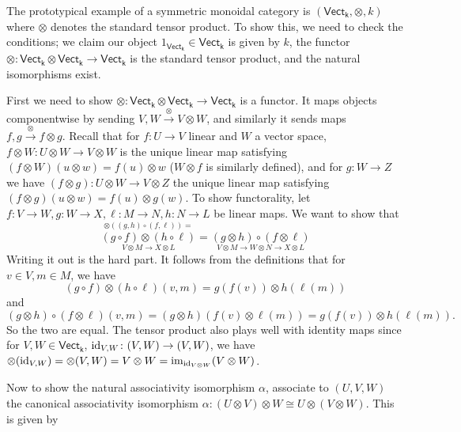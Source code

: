 \begin{example}
    The prototypical example of a symmetric monoidal category is $(\mathsf{Vect_k},\otimes, k) $ where $\otimes$ denotes the standard tensor product. To show this, we need to check the conditions; we claim our object $1_{\mathsf{Vect_k} } \in  \mathsf{Vect_k} $ is given by $k$, the functor $\otimes  \colon \mathsf{Vect_k}\otimes \mathsf{Vect_k}\to\mathsf{Vect_k} $ is the standard tensor product, and the natural isomorphisms exist.

    First we need to show $\otimes \colon \mathsf{Vect_k}  \otimes \mathsf{Vect_k}\to \mathsf{Vect_k}$ is a functor. It maps objects componentwise by sending $V,W \xrightarrow{\otimes } V\otimes W$, and similarly it sends maps $f,g \xrightarrow{\otimes} f\otimes g$. 
    Recall that for $f \colon U \to V$ linear and $W$ a vector space, $f \otimes W \colon U\otimes W \to V\otimes W$ is the unique linear map satisfying $(f\otimes W)(u\otimes w)=f(u)\otimes w$ ($W\otimes f$ is similarly  defined), and for $g \colon W \to Z$ we have $(f\otimes g) \colon U\otimes W\to V\otimes Z$ the unique linear map satisfying $(f\otimes g)(u\otimes w)=f(u)\otimes g(w)$. To show functorality, let $f \colon V \to W, g \colon  W \to X, \ell \colon M \to N,h \colon N \to L $ be linear maps. We want to show that \[
        \underset{V \otimes M \to X\otimes L}{\overset{\otimes ((g,h) \circ (f,\ell))=}{(g \circ f) \otimes (h \circ \ell)}}   = \underset{V\otimes M \to W\otimes N \to X\otimes L}{(g \otimes h) \circ (f\otimes \ell)} 
    \] Writing it out is the hard part. It follows from the definitions that for $v \in V, m \in M$, we have \[
    (g \circ f)\otimes (h \circ \ell)(v,m)=g(f(v))\otimes h(\ell(m))
    \] and \[
    (g \otimes h) \circ (f\otimes \ell)(v,m)=(g\otimes h)(f(v)\otimes \ell(m))=g(f(v))\otimes h(\ell(m)).
\] So the two are equal. The tensor product also plays well with identity maps since for $V,W \in  \mathsf{Vect_k} $, $\operatorname{id}_{V,W} \colon (V,W) \to (V,W)$, we have $\otimes (\operatorname{id} _{V,W})=\otimes (V,W)=V\otimes W=\operatorname{im}_{\operatorname{id}_{ V\otimes W}}(V\otimes W)$.

Now to show the natural associativity isomorphism $\alpha $, associate to $(U,V,W)$ the canonical associativity isomorphism $\alpha  \colon (U\otimes V)\otimes W \cong U\otimes (V\otimes W)$. This is given by 


\end{example}
